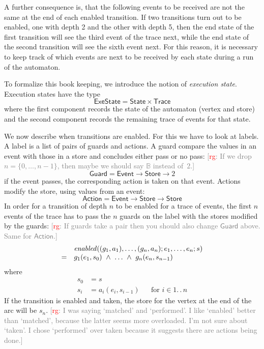 \documentclass[preprint]{sigplanconf} %
\newcommand{\note}[2]{\textcolor{gray}{[\textcolor{red}{#1}: #2]}}
\newcommand{\rg}[1]{\note{rg}{#1}}
\newcommand{\B}{\ensuremath{\mathbb{B}}}
\newcommand{\set}[1]{\ensuremath{\mathsf{#1}}}
\theoremstyle{definition}
\theoremstyle{remark}
\begin{document}
A further consequence is, that the following events to be received are
not the same at the end of each enabled transition. If two transitions
turn out to be enabled, one with depth 2 and the other with depth 5,
then the end state of the first transition will see the third event of
the trace next, while the end state of the second transition will see
the sixth event next. For this reason, it is necessary to keep track
of which events are next to be received by each state during a run of
the automaton.

To formalize this book keeping, we introduce the notion of
\emph{execution state}. Execution states have the type
\[
\set{ExeState} = \set{State}\times\set{Trace}
\]
where the first component records the state of the automaton (vertex
and store) and the second component records the remaining trace of
events for that state.

We now describe when transitions are enabled. For this we have to look
at labels. A label is a list of pairs of guards and actions. A
guard compare the values in an event with those in a store and
concludes either pass or no pass:
\rg{If we drop $n=\{0,\ldots,n-1\}$, then maybe we should say $\B$ instead of~$2$.}
\[
\set{Guard} = \set{Event}\to\set{Store}\to2
\]
if the event passes, the corresponding action is taken on that event.
Actions modify the store, using values from an event:
\[
\set{Action} = \set{Event}\to\set{Store}\to\set{Store}
\]
In order for a transition of depth $n$ to be enabled for a trace of
events, the first $n$ events of the trace has to pass the $n$ guards
on the label with the stores modified by the guards:
\rg{If guards take a pair then you should also change \set{Guard} above.
Same for \set{Action}.}
\[
\begin{array}{c l}
& \mathit{enabled}((g_1, a_1), \ldots, (g_n, a_n); e_1, \ldots, e_n; s) \\
 = &
g_1(e_1, s_0)\ \land\ \ldots\ \land\ g_n(e_n, s_{n-1}) 
\end{array}
\]
where
\begin{align}
  s_0 &=  s \\
  s_i &= a_i(e_i, s_{i-1}) &&\text{for $i\in1.\,.\,n$}
\end{align}
If the transition is enabled and taken, the store for the vertex at the end of the arc will be $s_n$.
\rg{I was saying `matched' and `performed'.
I like `enabled' better than `matched', because the latter seems more overloaded.
I'm not sure about `taken'.
I chose `performed' over taken because it suggests there are actions being done.}
\end{document}
